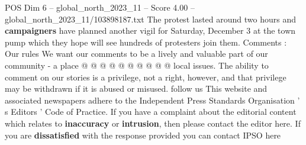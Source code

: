 \begin{textsample}{POS Dim 6 – global\_north\_2023\_11 – Score 4.00 – global\_north\_2023\_11/103898187.txt}
The protest lasted around two hours and \textbf{campaigners} have planned another vigil for Saturday, December 3 at the town pump which they hope will see hundreds of protesters join them.
Comments : Our rules We want our comments to be a lively and valuable part of our community - a place @ @ @ @ @ @ @ @ @ @ local issues.
The ability to comment on our stories is a privilege, not a right, however, and that privilege may be withdrawn if it is abused or misused. follow us This website and associated newspapers adhere to the Independent Press Standards Organisation ' s Editors ' Code of Practice.
If you have a complaint about the editorial content which relates to \textbf{inaccuracy} or \textbf{intrusion}, then please contact the editor here.
If you are \textbf{dissatisfied} with the response provided you can contact IPSO here

\end{textsample}
